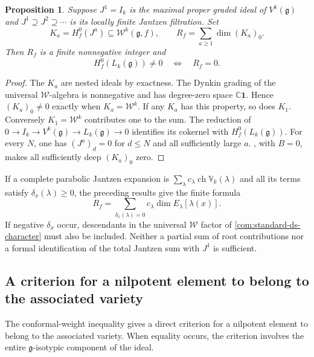 \documentclass[11pt,a4paper]{amsart}
\numberwithin{equation}{section}
\newtheorem{proposition}[theorem]{Proposition}
\theoremstyle{definition}
\theoremstyle{remark}
\newcommand{\C}{\mathbb C}
\newcommand{\g}{\mathfrak g}
\newcommand{\ch}{\operatorname{ch}}
\begin{document}
\begin{proposition}\label{com:vacuum-test}
Suppose $J^1=I_k$ is the maximal proper graded ideal of $V^k(\g)$ and
$J^1\supseteq J^2\supseteq\cdots$ is its locally finite Jantzen
filtration. Set
$$
 K_a=H_f^0(J^a)\subseteq\mathcal W^k(\g,f),\qquad
 R_f=\sum_{a\ge1}\dim(K_a)_0.
$$
Then $R_f$ is a finite nonnegative integer and
$$
 H_f^0(L_k(\g))\ne0\quad\Longleftrightarrow\quad R_f=0.
$$
\end{proposition}
\begin{proof}
The $K_a$ are nested ideals by exactness. The Dynkin
grading of the universal $\mathcal W$-algebra is nonnegative and
has degree-zero space $\C\mathbf1$. Hence $(K_a)_0\ne0$ exactly
when $K_a=\mathcal W^k$. If any $K_a$ has this property, so does
$K_1$. Conversely $K_1=\mathcal W^k$ contributes one to the sum.
The reduction of $0\to I_k\to V^k(\g)\to L_k(\g)\to0$
identifies its cokernel with $H_f^0(L_k(\g))$. For every $N$,
one has $(J^a)_d=0$ for $d\le N$ and all sufficiently large $a$. , with $B=0$,
makes all sufficiently deep $(K_a)_0$ zero.
\end{proof}

If a complete parabolic Jantzen expansion is
$\sum_\lambda c_\lambda\ch\mathbb V_k(\lambda)$ and all its
terms satisfy $\delta_x(\lambda)\ge0$, the preceding results give
the finite formula
\begin{equation}\label{com:equality-vacuum-sum}
 R_f=\sum_{\delta_x(\lambda)=0}
               c_\lambda\dim E_\lambda[\lambda(x)].
\end{equation}
If negative $\delta_x$ occur, descendants in the universal
$\mathcal W$ factor of \eqref{com:standard-ds-character} must also
be included. Neither a partial sum of root contributions nor a formal
identification of the total Jantzen sum with $J^1$ is sufficient.

\subsection{A criterion for a nilpotent element to belong to the associated variety}
The conformal-weight inequality gives a direct criterion for a nilpotent
element to belong to the associated variety. When equality occurs, the
criterion involves the entire $\g$-isotypic component of the ideal.
\end{document}

